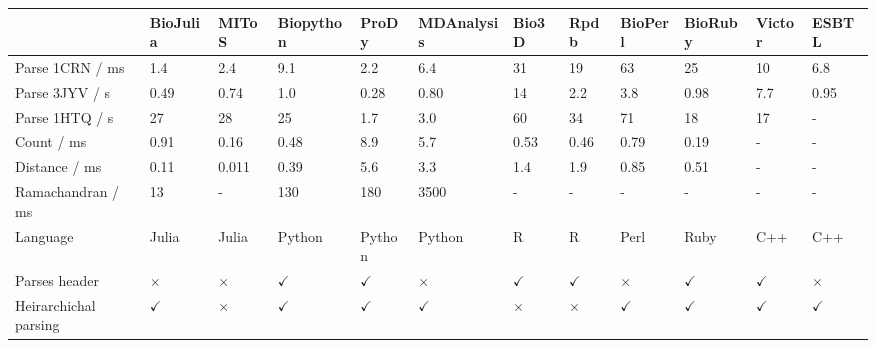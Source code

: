 \begin{table}
\centering

\begin{footnotesize}
\begin{tabular}{ l p{1.2cm} p{1.2cm} p{1.5cm} p{1.2cm} p{1.7cm} p{1.2cm} p{1.2cm} p{1.2cm} p{1.2cm} p{1.2cm} p{1.2cm} }
\hline
                      & BioJulia     & MIToS        & Biopython    & ProDy        & MDAnalysis   & Bio3D        & Rpdb         & BioPerl       & BioRuby      & Victor        & ESBTL        \\
\hline
Parse 1CRN / ms       & 1.4          & 2.4          & 9.1          & 2.2          & 6.4          & 31           & 19           & 63            & 25           & 10            & 6.8          \\
Parse 3JYV / s        & 0.49         & 0.74         & 1.0          & 0.28         & 0.80         & 14           & 2.2          & 3.8           & 0.98         & 7.7           & 0.95         \\
Parse 1HTQ / s        & 27           & 28           & 25           & 1.7          & 3.0          & 60           & 34           & 71            & 18           & 17            & -            \\
Count / ms            & 0.91         & 0.16         & 0.48         & 8.9          & 5.7          & 0.53         & 0.46         & 0.79          & 0.19         & -             & -            \\
Distance / ms         & 0.11         & 0.011        & 0.39         & 5.6          & 3.3          & 1.4          & 1.9          & 0.85          & 0.51         & -             & -            \\
Ramachandran / ms     & 13           & -            & 130          & 180          & 3500         & -            & -            & -             & -            & -             & -            \\
Language              & Julia        & Julia        & Python       & Python       & Python       & R            & R            & Perl          & Ruby         & C++           & C++          \\
Parses header         & $\times$     & $\times$     & $\checkmark$ & $\checkmark$ & $\times$     & $\checkmark$ & $\checkmark$ & $\times$      & $\checkmark$ & $\checkmark$  & $\times$     \\
Heirarchichal parsing & $\checkmark$ & $\times$     & $\checkmark$ & $\checkmark$ & $\checkmark$ & $\times$     & $\times$     & $\checkmark$  & $\checkmark$ & $\checkmark$  & $\checkmark$ \\

\end{tabular}
\end{footnotesize}
\end{table}
